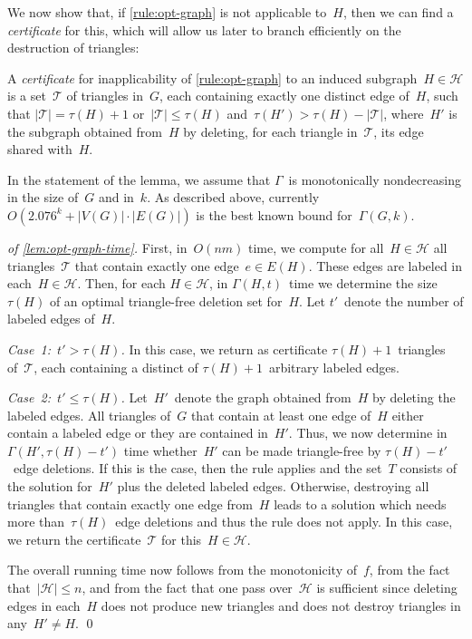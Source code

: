 \documentclass[envcountsame,numbook,smallextended]{svjour3}
\numberwithin{equation}{section}
\numberwithin{figure}{section}
\newcommand{\packing}{\ensuremath{\mathcal H}}
\newcommand{\Time}{\ensuremath{\Gamma}}
\begin{document}
\noindent We now show that, if \cref{rule:opt-graph} is not applicable to~$H$, then we can find a \emph{certificate} for this, which will allow us later to branch efficiently on the destruction of triangles:
\begin{definition}[Certificate]
  A \emph{certificate} for inapplicability of \cref{rule:opt-graph} to an induced subgraph~\(H\in\packing\) is a set~$\mathcal T$ of triangles in~$G$, each containing exactly one distinct edge of~$H$, such that $|\mathcal T|=\tau(H)+1$ or~$|\mathcal T|\le\tau(H)$ and~$\tau(H')>\tau(H)-|\mathcal T|$, where~$H'$ is the subgraph obtained from~$H$ by deleting, for each triangle in~$\mathcal{T}$, its edge shared with~$H$.
\end{definition}
\noindent
In the statement of the lemma,
we assume that
$\Time$~is monotonically nondecreasing
in the size of~$G$ and in~$k$.
As described above,
currently $O(2.076^k+|V(G)|\cdot |E(G)|)$
is the best known bound for~$\Time(G,k)$.
\begin{proof}[of \cref{lem:opt-graph-time}]
  First, in~$O(nm)$ time, we compute for all~$H\in\packing$ all triangles~$\mathcal T$ that contain exactly one edge~$e\in E(H)$. These edges are labeled in each~$H\in \packing$.  Then, for each $H\in \packing$, in $\Time(H,t)$~time we determine the size~$\tau(H)$ of an optimal triangle-free deletion set for~$H$. Let $t'$~denote the number of labeled edges of~$H$.  

\emph{Case~1:~$t'>\tau(H)$.} In this case, we return as certificate $\tau(H)+1$~triangles of~$\mathcal{T}$, each containing a distinct of $\tau(H)+1$~arbitrary labeled edges.  

\emph{Case~2:~$t'\le \tau(H)$.} Let~$H'$~denote the graph obtained from~$H$ by deleting the labeled edges. All triangles of~$G$ that contain at least one edge of~$H$ either contain a labeled edge or they are contained in~$H'$. Thus, we now determine in~$\Time(H',\tau(H)-t')$ time whether~$H'$ can be made triangle-free by $\tau(H)-t'$~edge deletions. If this is the case, then the rule applies and the set~$T$ consists of the solution for~$H'$ plus the deleted labeled edges.  Otherwise, destroying all triangles that contain exactly one edge from~$H$ leads to a solution which needs more than~$\tau(H)$~edge deletions and thus the rule does not apply. In this case, we return the certificate~$\mathcal T$ for this~$H\in \packing$. 

The overall running time now follows from the monotonicity of~$f$,
from the fact that~$|\packing|\le n$, and from the fact that one pass
over~$\packing$ is sufficient since deleting edges in each~$H$ does
not produce new triangles and does not destroy triangles in
any~$H'\neq H$.  \qed\end{proof}
\end{document}
